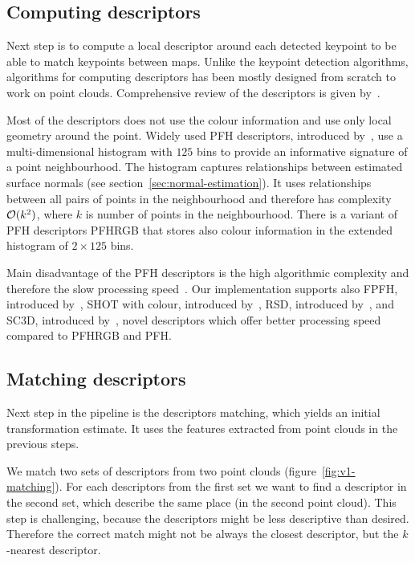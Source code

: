 \subsection{Computing descriptors}
\label{sec:compute-descriptors}

Next step is to compute a local descriptor around each detected keypoint to be able to match keypoints between maps. Unlike the keypoint detection algorithms, algorithms for computing descriptors has been mostly designed from scratch to work on point clouds. Comprehensive review of the descriptors is given by~\citet{YasirThesis}.

Most of the descriptors does not use the colour information and use only local geometry around the point. Widely used \gls{PFH} descriptors, introduced by~\citet{rusu2008pfh}, use a multi-dimensional histogram with $125$ bins to provide an informative signature of a point neighbourhood. The histogram captures relationships between estimated surface normals (see section~\ref{sec:normal-estimation}). It uses relationships between all pairs of points in the neighbourhood and therefore has complexity $\operatorname{\mathcal{O}}(k^2)$, where $k$ is number of points in the neighbourhood. There is a variant of \gls{PFH} descriptors \gls{PFHRGB} that stores also colour information in the extended histogram of $2 \times 125$ bins.

Main disadvantage of the \gls{PFH} descriptors is the high algorithmic complexity and therefore the slow processing speed~\citep{rusu2009fpfh}. Our implementation supports also \gls{FPFH}, introduced by~\citet{rusu2009fpfh}, \gls{SHOT} with colour, introduced by~\citet{tombari2011shot}, \gls{RSD}, introduced by~\citet{marton2010rsd}, and \gls{SC3D}, introduced by~\citet{frome2004sc3d}, novel descriptors which offer better processing speed compared to \gls{PFHRGB} and \gls{PFH}.

\subsection{Matching descriptors}
\label{sec:matching}

Next step in the pipeline is the descriptors matching, which yields an initial transformation estimate. It uses the features extracted from point clouds in the previous steps.

We match two sets of descriptors from two point clouds (figure~\ref{fig:v1-matching}). For each descriptors from the first set we want to find a descriptor in the second set, which describe the same place (in the second point cloud). This step is challenging, because the descriptors might be less descriptive than desired. Therefore the correct match might not be always the closest descriptor, but the $k$-nearest descriptor.

